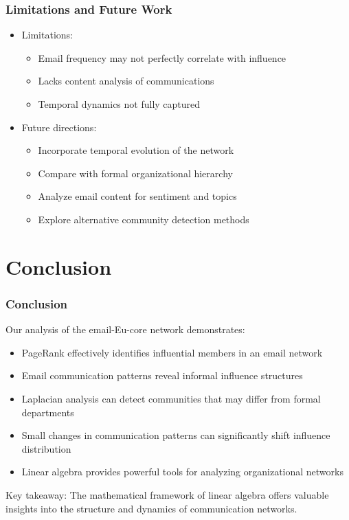 \documentclass{beamer}
\begin{document}
\begin{frame}
    \frametitle{Limitations and Future Work}
    \begin{itemize}
        \item Limitations:
        \begin{itemize}
            \item Email frequency may not perfectly correlate with influence
            \item Lacks content analysis of communications
            \item Temporal dynamics not fully captured
        \end{itemize}
        \item Future directions:
        \begin{itemize}
            \item Incorporate temporal evolution of the network
            \item Compare with formal organizational hierarchy
            \item Analyze email content for sentiment and topics
            \item Explore alternative community detection methods
        \end{itemize}
    \end{itemize}
\end{frame}

\section{Conclusion}

\begin{frame}
    \frametitle{Conclusion}
    Our analysis of the email-Eu-core network demonstrates:
    \begin{itemize}
        \item PageRank effectively identifies influential members in an email network
        \item Email communication patterns reveal informal influence structures
        \item Laplacian analysis can detect communities that may differ from formal departments
        \item Small changes in communication patterns can significantly shift influence distribution
        \item Linear algebra provides powerful tools for analyzing organizational networks
    \end{itemize}
    
    Key takeaway: The mathematical framework of linear algebra offers valuable insights into the structure and dynamics of communication networks.
\end{frame}
\end{document}
